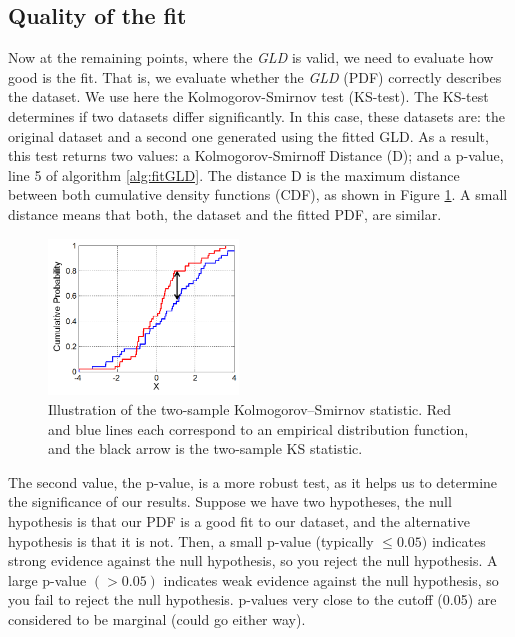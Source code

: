\subsection{Quality of the fit}
\label{Quality of the fit}
Now at the remaining points, where the \textit{GLD} is valid, we need to evaluate how good is the fit. That is, we evaluate whether the \textit{GLD} (PDF) correctly describes the dataset. We use here the Kolmogorov-Smirnov test (KS-test). The KS-test  determines if two datasets differ significantly. In this case, these datasets are: the original dataset and a second one generated using the fitted GLD. As a result, this test returns two values: a Kolmogorov-Smirnoff Distance (D); and a p-value, line 5 of algorithm \ref{alg:fitGLD}. The distance D is the maximum distance between both cumulative density functions (CDF), as shown in Figure \ref{fig:D_distance}. A small distance means that both, the dataset and the fitted PDF, are similar. 

\begin{figure}[ht]
    \centering
    \includegraphics[width=0.45\textwidth]{img/D_distance.png}
    \caption{Illustration of the two-sample Kolmogorov–Smirnov statistic. Red and blue lines each correspond to an empirical distribution function, and the black arrow is the two-sample KS statistic.}
    \label{fig:D_distance}
\end{figure}

The second value, the p-value, is a more robust test, as it helps us to determine the significance of our results. Suppose we have two hypotheses, the null hypothesis  is that our PDF is a good fit to our dataset, and the alternative hypothesis  is that it is not. Then, a small p-value (typically $\leq 0.05)$ indicates strong evidence against the null hypothesis, so you reject the null hypothesis. A large p-value $(> 0.05)$ indicates weak evidence against the null hypothesis, so you fail to reject the null hypothesis. p-values very close to the cutoff (0.05) are considered to be marginal (could go either way). 

